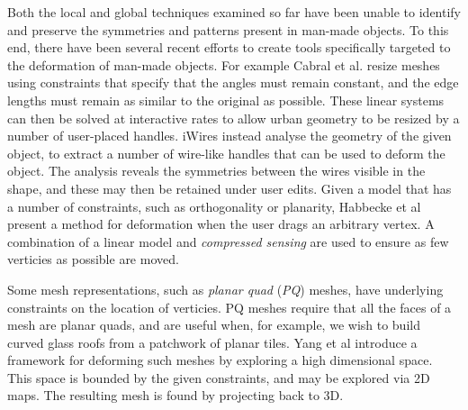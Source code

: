 Both the local and global techniques examined so far have been unable to identify and preserve the symmetries and patterns present in man-made objects. To this end, there have been several recent efforts to create tools specifically targeted to the deformation of man-made objects. For example Cabral et al.\cite{Cabral09} resize meshes using constraints that specify that the angles must remain constant, and the edge lengths must remain as similar to the original as possible. These linear systems can then be solved at interactive rates to allow urban geometry to be resized by a number of user-placed handles. iWires\cite{Gal09} instead analyse the geometry of the given object, to extract a number of wire-like handles that can be used to deform the object. The analysis reveals the symmetries between the wires visible in the shape, and these may then be retained under user edits. Given a model that has a number of constraints, such as orthogonality or planarity, Habbecke et al\cite{Habbecke12} present a method for deformation when the user drags an arbitrary vertex. A combination of a linear model and \emph{compressed sensing} are used to ensure as few verticies as possible are moved.

Some mesh representations, such as \emph{planar quad} (\emph{PQ}) meshes, have underlying constraints on the location of verticies. PQ meshes require that all the faces of a mesh are planar quads, and are useful when, for example, we wish to build curved glass roofs from a patchwork of planar tiles. Yang et al\cite{Yang11} introduce a framework for deforming such meshes by exploring a high dimensional space. This space is bounded by the given constraints, and may be explored via 2D maps. The resulting mesh is found by projecting back to 3D.




